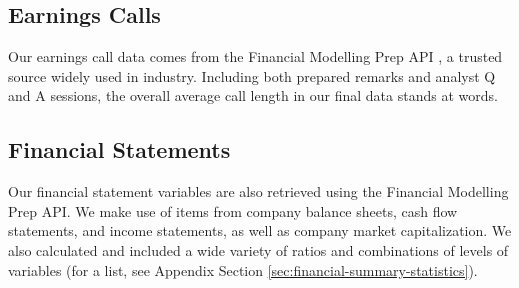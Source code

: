 \documentclass{article}[11pt]
\begin{document}
    \subsection*{Earnings Calls}

    Our earnings call data comes from the Financial Modelling Prep API \citep{financial_modeling_prep_financial_2024}, a trusted source widely used in industry. Including both prepared remarks and analyst Q and A sessions, the overall average call length in our final data stands at \avgCallLength \space words.

    \subsection*{Financial Statements}

    Our financial statement variables are also retrieved using the Financial Modelling Prep API. We make use of items from company balance sheets, cash flow statements, and income statements, as well as company market capitalization. We also calculated and included a wide variety of ratios and combinations of levels of variables (for a list, see Appendix Section \ref{sec:financial-summary-statistics}).
\end{document}
